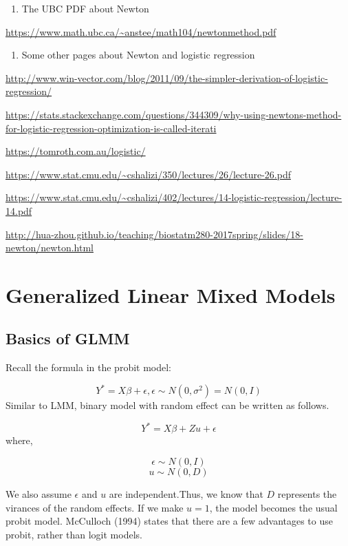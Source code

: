 \documentclass[]{book}
\providecommand{\tightlist}{%
  \setlength{\itemsep}{0pt}\setlength{\parskip}{0pt}}
\begin{document}
\begin{enumerate}
\def\labelenumi{\arabic{enumi}.}
\tightlist
\item
  The UBC PDF about Newton
\end{enumerate}

\url{https://www.math.ubc.ca/~anstee/math104/newtonmethod.pdf}

\begin{enumerate}
\def\labelenumi{\arabic{enumi}.}
\setcounter{enumi}{1}
\tightlist
\item
  Some other pages about Newton and logistic regression
\end{enumerate}

\url{http://www.win-vector.com/blog/2011/09/the-simpler-derivation-of-logistic-regression/}

\url{https://stats.stackexchange.com/questions/344309/why-using-newtons-method-for-logistic-regression-optimization-is-called-iterati}

\url{https://tomroth.com.au/logistic/}

\url{https://www.stat.cmu.edu/~cshalizi/350/lectures/26/lecture-26.pdf}

\url{https://www.stat.cmu.edu/~cshalizi/402/lectures/14-logistic-regression/lecture-14.pdf}

\url{http://hua-zhou.github.io/teaching/biostatm280-2017spring/slides/18-newton/newton.html}

\chapter{Generalized Linear Mixed
Models}\label{generalized-linear-mixed-models}

\section{Basics of GLMM}\label{basics-of-glmm}

Recall the formula in the probit model:

\[Y^*=X\beta+\epsilon, \epsilon \sim N(0,\sigma^2)=N(0,I)\] Similar to
LMM, binary model with random effect can be written as follows.

\[Y^*=X\beta+ Z u+\epsilon\] where,

\[\epsilon \sim N(0,I)\] \[u \sim N(0, D)\]

We also assume \(\epsilon\) and \(u\) are independent.Thus, we know that
\(D\) represents the virances of the random effects. If we make
\(u =1\), the model becomes the usual probit model. McCulloch (1994)
states that there are a few advantages to use probit, rather than logit
models.
\end{document}
